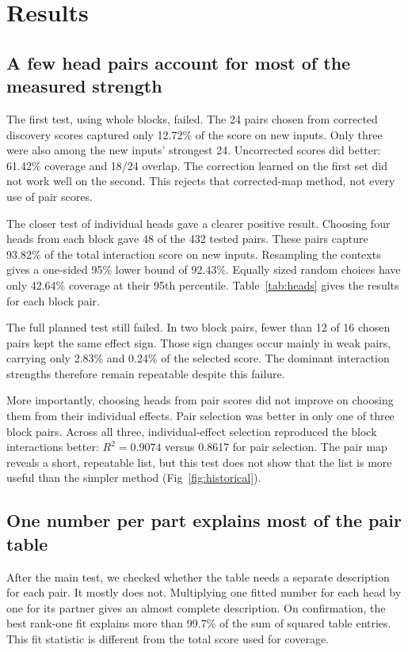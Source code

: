 \documentclass[11pt,letterpaper]{article}
\begin{document}
\section*{Results}
\subsection*{A few head pairs account for most of the measured strength}
The first test, using whole blocks, failed. The 24 pairs chosen from corrected
discovery scores captured only 12.72\% of the score on new inputs. Only three
were also among the new inputs' strongest 24. Uncorrected scores did better:
61.42\% coverage and 18/24 overlap. The correction learned on the first set
did not work well on the second. This rejects that corrected-map method, not
every use of pair scores.

The closer test of individual heads gave a clearer positive result. Choosing
four heads from each block gave 48 of the 432 tested pairs. These pairs capture
93.82\% of the total interaction score on new inputs. Resampling the contexts
gives a one-sided 95\% lower bound of 92.43\%. Equally sized random choices
have only 42.64\% coverage at their 95th percentile.
Table~\ref{tab:heads} gives the results for each block pair.





The full planned test still failed. In two block pairs, fewer than 12 of 16
chosen pairs kept the same effect sign. Those sign changes occur mainly in
weak pairs, carrying only 2.83\% and 0.24\% of the selected score. The dominant
interaction strengths therefore remain repeatable despite this failure.

More importantly, choosing heads from pair scores did not improve on choosing
them from their individual effects. Pair selection was better in only one of
three block pairs. Across all three, individual-effect selection reproduced
the block interactions better: $R^2=0.9074$ versus 0.8617 for pair selection.
The pair map reveals a short, repeatable list, but this test does not show
that the list is more useful than the simpler method (Fig~\ref{fig:historical}).



\subsection*{One number per part explains most of the pair table}
After the main test, we checked whether the table needs a separate description
for each pair. It mostly does not. Multiplying one fitted number for each head
by one for its partner gives an almost complete description. On confirmation,
the best rank-one fit explains more than 99.7\% of the sum of squared table
entries. This fit statistic is different from the total score used for coverage.
\end{document}
